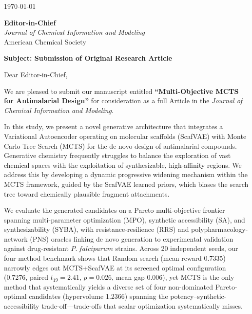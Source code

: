 \documentclass[11pt,a4paper]{article}
\begin{document}
\begin{flushright}
\today
\end{flushright}

\vspace{1em}

\noindent
\textbf{Editor-in-Chief}\\
\textit{Journal of Chemical Information and Modeling}\\
American Chemical Society

\vspace{2em}

\noindent
\textbf{Subject: Submission of Original Research Article}

\vspace{1em}

\noindent
Dear Editor-in-Chief,

\vspace{1em}

\noindent
We are pleased to submit our manuscript entitled \textbf{``Multi-Objective MCTS for Antimalarial Design''} for consideration as a full Article in the \textit{Journal of Chemical Information and Modeling}.

\vspace{1em}

\noindent
In this study, we present a novel generative architecture that integrates a Variational Autoencoder operating on molecular scaffolds (ScafVAE) with Monte Carlo Tree Search (MCTS) for the de novo design of antimalarial compounds. Generative chemistry frequently struggles to balance the exploration of vast chemical spaces with the exploitation of synthesizable, high-affinity regions. We address this by developing a dynamic progressive widening mechanism within the MCTS framework, guided by the ScafVAE learned priors, which biases the search tree toward chemically plausible fragment attachments.

\vspace{1em}

\noindent
We evaluate the generated candidates on a Pareto multi-objective frontier spanning multi-parameter optimization (MPO), synthetic accessibility (SA), and synthesizability (SYBA), with resistance-resilience (RRS) and polypharmacology-network (PNS) oracles linking de novo generation to experimental validation against drug-resistant $P.~falciparum$ strains. Across 20 independent seeds, our four-method benchmark shows that Random search (mean reward 0.7335) narrowly edges out MCTS+ScafVAE at its screened optimal configuration (0.7276, paired $t_{19} = 2.41$, $p = 0.026$, mean gap 0.006), yet MCTS is the only method that systematically yields a diverse set of four non-dominated Pareto-optimal candidates (hypervolume 1.2366) spanning the potency--synthetic-accessibility trade-off---trade-offs that scalar optimization systematically misses.
\end{document}
